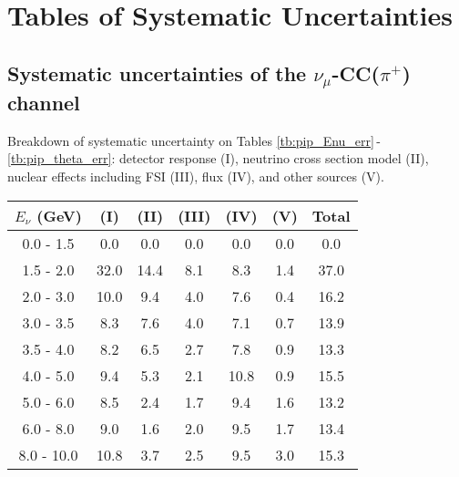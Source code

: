 \documentclass[aps, prd, reprint,showpacs,  preprintnumbers,amsmath,amssymb,superscriptaddress, nofootinbib]{revtex4-1}
\makeatletter
\newcommand{\numu}{\mbox{$\nu_{\mu}$}}                   %
\renewenvironment{table}
  {\def\@captype{table}}
  {}
\makeatother
\begin{document}




\onecolumngrid
\section{Tables of Systematic Uncertainties}


\subsection{Systematic uncertainties of the $\numu$-CC($\pi^{+}$) channel}

Breakdown of systematic uncertainty on Tables \ref{tb:pip_Enu_err}\,-\,\ref{tb:pip_theta_err}: detector response (I), neutrino cross section model (II), nuclear effects including FSI (III), flux (IV), 
and other sources (V). %

\vspace{0.5cm}


\begin{table}
\centering
\begin{tabular}{ccccccc}
\hline
$E_{\nu}$ (GeV) & (I) & (II) & (III) & (IV) & (V) & Total \\
\hline
 0.0 -  1.5 &   0.0  &  0.0 &  0.0  &  0.0  &  0.0  &  0.0 \\
 1.5 -  2.0 &  32.0  & 14.4 &  8.1  &  8.3  &  1.4  & 37.0 \\
 2.0 -  3.0 &  10.0  &  9.4 &  4.0  &  7.6  &  0.4  & 16.2 \\
 3.0 -  3.5 &   8.3  &  7.6 &  4.0  &  7.1  &  0.7  & 13.9 \\
 3.5 -  4.0 &   8.2  &  6.5 &  2.7  &  7.8  &  0.9  & 13.3 \\
 4.0 -  5.0 &   9.4  &  5.3 &  2.1  & 10.8  &  0.9  & 15.5 \\
 5.0 -  6.0 &   8.5  &  2.4 &  1.7  &  9.4  &  1.6  & 13.2 \\
 6.0 -  8.0 &   9.0  &  1.6 &  2.0  &  9.5  &  1.7  & 13.4 \\
 8.0 - 10.0 &  10.8  &  3.7 &  2.5  &  9.5  &  3.0  & 15.3 \\
\hline\hline
\end{tabular}
\caption{Fractional systematic uncertainties (in percent) on $\sigma(E_\nu)$.}
\label{tb:pip_Enu_err}
\end{table}
\end{document}
